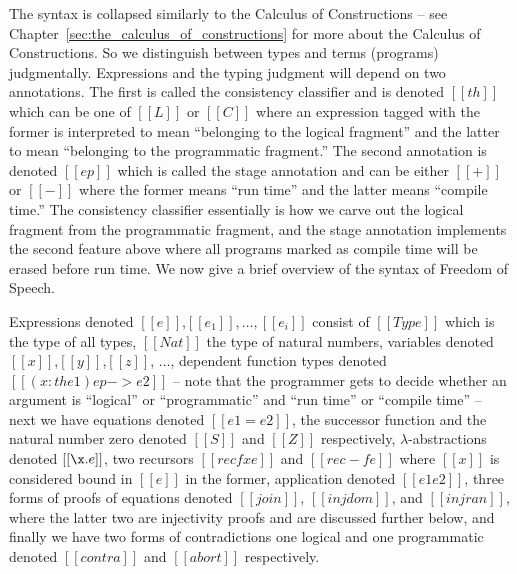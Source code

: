 The syntax is collapsed similarly to the Calculus of Constructions --
see Chapter~\ref{sec:the_calculus_of_constructions} for more about the
Calculus of Constructions. So we distinguish between types and terms
(programs) judgmentally.  Expressions and the typing judgment will
depend on two annotations.  The first is called the consistency
classifier and is denoted $[[th]]$ which can be one of $[[L]]$ or
$[[C]]$ where an expression tagged with the former is interpreted to
mean ``belonging to the logical fragment'' and the latter to mean
``belonging to the programmatic fragment.''  The second annotation is
denoted $[[ep]]$ which is called the stage annotation and can be
either $[[+]]$ or $[[-]]$ where the former means ``run time'' and the
latter means ``compile time.'' The consistency classifier essentially
is how we carve out the logical fragment from the programmatic
fragment, and the stage annotation implements the second feature above
where all programs marked as compile time will be erased before run
time.  We now give a brief overview of the syntax of Freedom of
Speech.

Expressions denoted $[[e]]$,$[[e_1]],\ldots,[[e_i]]$ consist of
$[[Type]]$ which is the type of all types, $[[Nat]]$ the type of
natural numbers, variables denoted $[[x]]$,$[[y]]$,$[[z]]$, $\ldots$,
dependent function types denoted $[[(x : th e1) ep -> e2]]$ -- note that
the programmer gets to decide whether an argument is ``logical'' or
``programmatic'' and ``run time'' or ``compile time'' -- next we have
equations denoted $[[e1 = e2]]$, the successor function and the
natural number zero denoted $[[S]]$ and $[[Z]]$ respectively,
$\lambda$-abstractions denoted $[[\x.e]]$, two recursors $[[rec f x
e]]$ and $[[rec - f e]]$ where $[[x]]$ is considered bound in $[[e]]$
in the former, application denoted $[[e1 e2]]$, three forms of proofs
of equations denoted $[[join]]$, $[[injdom]]$, and $[[injran]]$, where
the latter two are injectivity proofs and are discussed further below,
and finally we have two forms of contradictions one logical and one
programmatic denoted $[[contra]]$ and $[[abort]]$ respectively.


